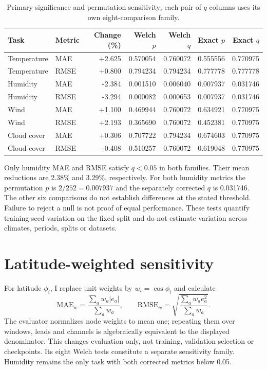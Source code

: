 \documentclass[10pt,a4paper]{article}
\begin{document}
\begin{table}[H]\centering\small\setlength{\tabcolsep}{5pt}\setlength{\parskip}{0pt}

\caption{Primary significance and permutation sensitivity; each pair of $q$ columns uses its own eight-comparison family.}\label{tab:primary_tests}

\begin{tabular}{llrrrrr}

\toprule
Task & Metric & Change (\%) & Welch $p$ & Welch $q$ & Exact $p$ & Exact $q$ \\
\midrule

Temperature & MAE & +2.625 & 0.570054 & 0.760072 & 0.555556 & 0.770975 \\

Temperature & RMSE & +0.800 & 0.794234 & 0.794234 & 0.777778 & 0.777778 \\

Humidity & MAE & -2.384 & 0.001510 & 0.006040 & 0.007937 & 0.031746 \\

Humidity & RMSE & -3.294 & 0.000082 & 0.000653 & 0.007937 & 0.031746 \\

Wind & MAE & +1.100 & 0.469944 & 0.760072 & 0.634921 & 0.770975 \\

Wind & RMSE & +2.193 & 0.365690 & 0.760072 & 0.452381 & 0.770975 \\

Cloud cover & MAE & +0.306 & 0.707722 & 0.794234 & 0.674603 & 0.770975 \\

Cloud cover & RMSE & -0.408 & 0.510257 & 0.760072 & 0.619048 & 0.770975 \\

\bottomrule\end{tabular}\end{table}

Only humidity MAE and RMSE satisfy $q<0.05$ in both families. Their mean reductions are 2.38\% and 3.29\%, respectively. For both humidity metrics the permutation $p$ is $2/252=0.007937$ and the separately corrected $q$ is 0.031746. The other six comparisons do not establish differences at the stated threshold. Failure to reject a null is not proof of equal performance. These tests quantify training-seed variation on the fixed split and do not estimate variation across climates, periods, splits or datasets.

\section{Latitude-weighted sensitivity}
For latitude $\phi_i$, I replace unit weights by $w_i=\cos\phi_i$ and calculate
\[
\mathrm{MAE}_w=\frac{\sum_a w_a|e_a|}{\sum_a w_a},\qquad
\mathrm{RMSE}_w=\sqrt{\frac{\sum_a w_a e_a^2}{\sum_a w_a}}.
\]
The evaluator normalizes node weights to mean one; repeating them over windows, leads and channels is algebraically equivalent to the displayed denominator. This changes evaluation only, not training, validation selection or checkpoints. Its eight Welch tests constitute a separate sensitivity family. Humidity remains the only task with both corrected metrics below 0.05.
\end{document}
